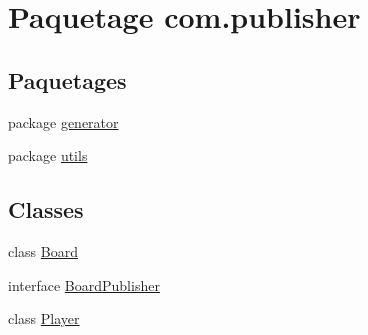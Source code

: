 \hypertarget{namespacecom_1_1publisher}{\section{Paquetage com.\-publisher}
\label{namespacecom_1_1publisher}
}
\subsection*{Paquetages}
\begin{DoxyCompactItemize}
\item 
package \hyperlink{namespacecom_1_1publisher_1_1generator}{generator}
\item 
package \hyperlink{namespacecom_1_1publisher_1_1utils}{utils}
\end{DoxyCompactItemize}
\subsection*{Classes}
\begin{DoxyCompactItemize}
\item 
class \hyperlink{classcom_1_1publisher_1_1Board}{Board}
\item 
interface \hyperlink{interfacecom_1_1publisher_1_1BoardPublisher}{Board\-Publisher}
\item 
class \hyperlink{classcom_1_1publisher_1_1Player}{Player}
\end{DoxyCompactItemize}
